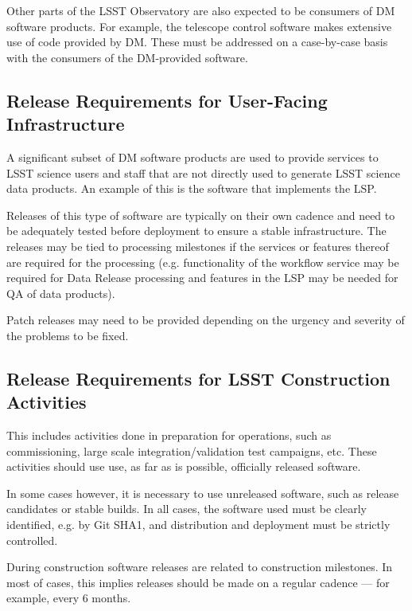 Other parts of the LSST Observatory are also expected to be consumers of \gls{DM} software products.
For example, the telescope control software makes extensive use of code provided by \gls{DM}.
These must be addressed on a case-by-case basis with the consumers of the \gls{DM}-provided software.


\subsection{Release Requirements for User-Facing Infrastructure} \label{sec:infreqs}

A significant subset of \gls{DM} software products are used to provide services to \gls{LSST} science users and staff that are not directly used to generate \gls{LSST} science data products.
An example of this is the software that implements the \gls{LSP}.

Releases of this type of software are typically on their own cadence and need to be adequately tested before deployment to ensure a stable infrastructure.
The releases may be tied to processing milestones if the services or features thereof are required for the processing (e.g. functionality of the workflow service may be required for \gls{Data Release} processing and features in the \gls{LSP} may be needed for \gls{QA} of data products).

Patch releases may need to be provided depending on the urgency and severity of the problems to be fixed.


\subsection{Release Requirements for LSST Construction Activities} \label{sec:nonopsreqs}

This includes activities done in preparation for operations, such as commissioning, large scale integration/validation test campaigns, etc.
These activities should use use, as far as is possible, officially released software.

In some cases however, it is necessary to use unreleased software, such as release candidates or stable builds.
In all cases, the software used must be clearly identified, e.g. by Git SHA1, and distribution and deployment must be strictly controlled.

During construction software releases are related to construction milestones.
In most of cases, this implies releases should be made on a regular cadence --- for example, every 6 months.


